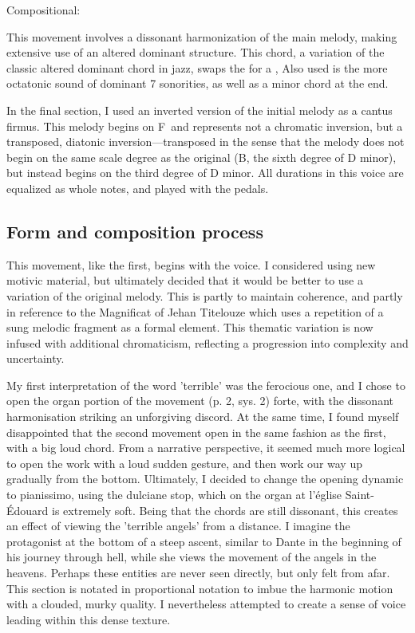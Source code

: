 \documentclass[12pt,twoside,maitrise]{dms_ks}
\theoremstyle{definition}
\begin{document}
{Compositional:

This movement involves a dissonant harmonization of the main melody, making extensive use of an altered dominant  structure.
This chord, a variation of the classic altered dominant chord in jazz, swaps the  for a , 
Also used is the more octatonic sound of dominant 7   sonorities, as well as a minor  chord at the end.

In the final section, I used an inverted version of the initial melody as a cantus firmus.
This melody begins on F\na\ and represents not a chromatic inversion, but a transposed, diatonic inversion---transposed in the sense that the melody does not begin on the same scale degree as the original (B\fl, the sixth degree of D minor), but instead begins on the third degree of D minor. 
All durations in this voice are equalized as whole notes, and played with the pedals.

\subsection{Form and composition process}

This movement, like the first, begins with the voice.
I considered using new motivic material, but ultimately decided that it would be better to use a variation of the original melody.
This is partly to maintain coherence, and partly in reference to the Magnificat of Jehan Titelouze which uses a repetition of a sung melodic fragment as a formal element.
This thematic variation is now infused with additional chromaticism, reflecting a progression into complexity and uncertainty.


My first interpretation of the word 'terrible' was the ferocious one, and I chose to open the organ portion of the movement (p. 2, sys. 2) forte, with the dissonant harmonisation striking an unforgiving discord. 
At the same time, I found myself disappointed that the second movement open in the same fashion as the first, with a big loud chord.
From a narrative perspective, it seemed much more logical to open the work with a loud sudden gesture, and then work our way up gradually from the bottom.
Ultimately, I decided to change the opening dynamic to pianissimo, using the dulciane stop, which on the organ at l'église Saint-Édouard is extremely soft.
Being that the chords are still dissonant, this creates an effect of viewing the 'terrible angels' from a distance. 
I imagine the protagonist at the bottom of a steep ascent, similar to Dante in the beginning of his journey through hell, while she views the movement of the angels in the heavens.
Perhaps these entities are never seen directly, but only felt from afar.
This section is notated in proportional notation to imbue the harmonic motion with a clouded, murky quality.
I nevertheless attempted to create a sense of voice leading within this dense texture.

}
\end{document}
